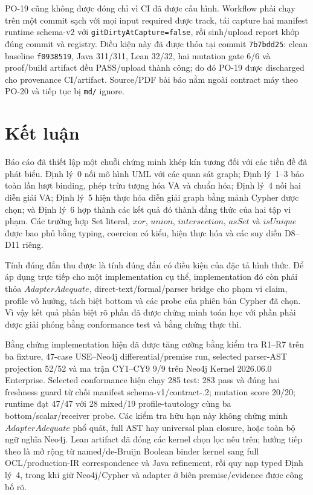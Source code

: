 \documentclass[11pt,a4paper]{article}
\theoremstyle{definition}
\begin{document}
PO-19 cũng không được đóng chỉ vì CI đã được cấu hình. Workflow phải chạy trên
một commit sạch với mọi input required được track, tái capture hai manifest
runtime schema-v2 với \texttt{gitDirtyAtCapture=false}, rồi sinh/upload report
khớp đúng commit và registry. Điều kiện này đã được thỏa tại commit
\texttt{7b7bdd25}: clean baseline \texttt{f0938519}, Java 311/311, Lean 32/32,
hai mutation gate 6/6 và proof/build artifact đều PASS/upload thành công; do đó
PO-19 được discharged cho provenance CI/artifact. Source/PDF bài báo nằm ngoài
contract máy theo PO-20 và tiếp tục bị \texttt{md/} ignore.

\section{Kết luận}

Báo cáo đã thiết lập một chuỗi chứng minh khép kín tương đối với các tiền đề đã
phát biểu. Định lý~0 nối mô hình UML với các quan sát graph; Định lý~1--3 bảo
toàn lần lượt binding, phép trừu tượng hóa VA và chuẩn hóa; Định lý~4 nối hai
diễn giải VA; Định lý~5 hiện thực hóa diễn giải graph bằng mảnh Cypher được
chọn; và Định lý~6 hợp thành các kết quả đó thành đẳng thức của hai tập vi
phạm. Các trường hợp Set literal, $xor$, $union$, $intersection$, $asSet$ và
$isUnique$ được bao phủ bằng typing, coercion có kiểu, hiện thực hóa và các suy
diễn D8--D11 riêng.

Tính đúng đắn thu được là tính đúng đắn có điều kiện của đặc tả hình thức. Để
áp dụng trực tiếp cho một implementation cụ thể, implementation đó còn phải
thỏa $AdapterAdequate$, direct-text/formal/parser bridge cho phạm vi claim,
profile vô hướng, tách biệt bottom và các probe của phiên bản Cypher đã chọn.
Vì vậy kết quả phân biệt rõ
phần đã được chứng minh toán học với phần phải được giải phóng bằng conformance
test và bằng chứng thực thi.

Bằng chứng implementation hiện đã được tăng cường bằng kiểm tra R1--R7 trên ba
fixture, 47-case USE--Neo4j differential/premise run, selected parser-AST
projection 52/52 và ma trận CY1--CY9 9/9 trên Neo4j Kernel 2026.06.0
Enterprise. Selected conformance hiện chạy 285 test: 283 pass và đúng hai
freshness guard từ chối manifest schema-v1/contract-.2; mutation score 20/20;
runtime đạt 47/47 với 28 mixed/19 profile-tautology cùng ba
bottom/scalar/receiver probe.
Các kiểm tra hữu hạn này không chứng minh $AdapterAdequate$ phổ quát, full AST
hay universal plan closure, hoặc toàn bộ ngữ nghĩa Neo4j. Lean artifact đã
đóng các kernel chọn lọc nêu trên; hướng tiếp theo là mở rộng từ named/de-Bruijn
Boolean binder kernel sang full OCL/production-IR correspondence và Java refinement,
rồi quy nạp typed Định lý~4, trong khi giữ
Neo4j/Cypher và adapter ở biên premise/evidence được công bố rõ.
\end{document}
